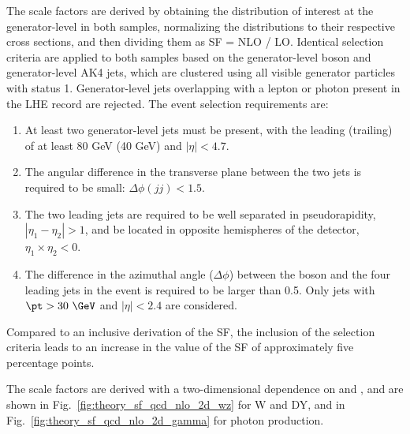 The scale factors are derived by obtaining the distribution of interest at the generator-level in both samples, normalizing the distributions to their respective cross sections, and then dividing them as SF = NLO / LO. Identical selection criteria are applied to both samples based on the generator-level boson and generator-level AK4 jets, which are clustered using all visible generator particles with status 1. Generator-level jets overlapping with a lepton or photon present in the LHE record are rejected. The event selection requirements are:

\begin{enumerate}
\item At least two generator-level jets must be present, with the leading (trailing) \pt of at least 80 GeV (40 GeV) and $|\eta|<4.7$.
\item The angular difference in the transverse plane between the two jets is required to be small: $\Delta\phi(jj) < 1.5$.
\item The two leading jets are required to be well separated in pseudorapidity, $|\eta_{1}-\eta_{2}| > 1$, and be located in opposite hemispheres of the detector, $\eta_{1}\times \eta_{2}<0$.
\item The difference in the azimuthal angle ($\Delta\phi$) between the boson and the four leading jets in the event is required to be larger than 0.5. Only jets with $\pt>30~\GeV$ and $|\eta|<2.4$ are considered.
\end{enumerate}

Compared to an inclusive derivation of the SF, the inclusion of the selection criteria leads to an increase in the value of the SF of approximately five percentage points.


The scale factors are derived with a two-dimensional dependence on \ptv and \mjj, and are shown in Fig.~\ref{fig:theory_sf_qcd_nlo_2d_wz} for W and DY, and in Fig.~\ref{fig:theory_sf_qcd_nlo_2d_gamma} for photon production.

